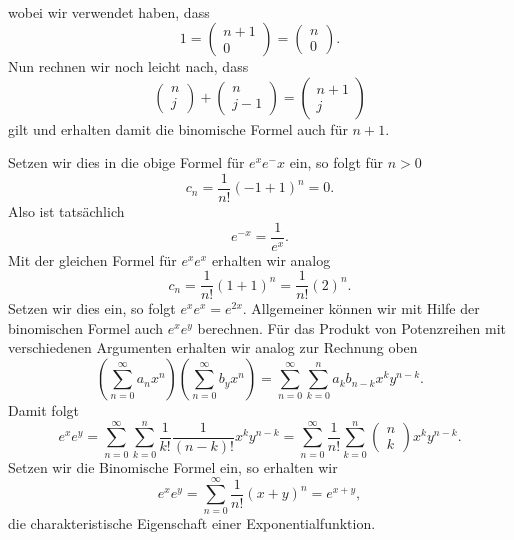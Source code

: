 \begin{emphBox}{}{}
\begin{align*}
\end{align*}
wobei wir verwendet haben, dass
\begin{equation*}
1 =
\begin{pmatrix} n+1\\ 0 \end{pmatrix} 
= \begin{pmatrix} n\\ 0 \end{pmatrix}.
\end{equation*}
Nun rechnen wir noch leicht nach, dass
\begin{equation*}
\begin{pmatrix} n\\j \end{pmatrix} +  \begin{pmatrix} n\\j-1 \end{pmatrix}
=
\begin{pmatrix} n+1\\j \end{pmatrix}
\end{equation*}
gilt und erhalten damit die binomische Formel auch für \(n+1\).
\end{emphBox}

Setzen wir dies in die obige Formel für \(e^x e^-x\) ein, so folgt für \(n > 0\)
\begin{equation*}
c_n = \frac{1}{n!}(-1+1)^n = 0 .
\end{equation*}
Also ist tatsächlich
\begin{equation*}
 e^{-x} = \frac{1}{e^x}.
\end{equation*}
Mit der gleichen Formel für \(e^x e^x\) erhalten wir analog
\begin{equation*}
 c_n = \frac{1}{n!}(1+1)^n =  \frac{1}{n!}(2)^n .
\end{equation*}
Setzen wir dies ein, so folgt \(e^x e^x = e^{2x}\).
Allgemeiner können wir mit Hilfe der binomischen Formel auch \(e^x e^y\) berechnen. Für das Produkt von Potenzreihen mit verschiedenen Argumenten erhalten wir analog zur Rechnung oben
\begin{equation*}
\left( \sum_{n=0}^\infty  a_n x^n \right) \left( \sum_{n=0}^\infty b_y x^n \right) =
\sum_{n=0}^\infty \sum_{k=0}^n a_k b_{n-k} x^k y^{n-k}.
\end{equation*}
Damit folgt
\begin{equation*}
 e^x e^y = \sum_{n=0}^\infty \sum_{k=0}^n \frac{1}{k!} \frac{1}{(n-k)!} x^k y^{n-k} =
\sum_{n=0}^\infty \frac{1}{n!} \sum_{k=0}^n (\begin{matrix} n\\ k \end{matrix} )  x^k y^{n-k}.
\end{equation*}
Setzen wir die Binomische Formel ein, so erhalten wir
\begin{equation*}
 e^x e^y = \sum_{n=0}^\infty \frac{1}{n!}  (x+y)^n = e^{x+y},
\end{equation*}
die charakteristische Eigenschaft einer Exponentialfunktion.



